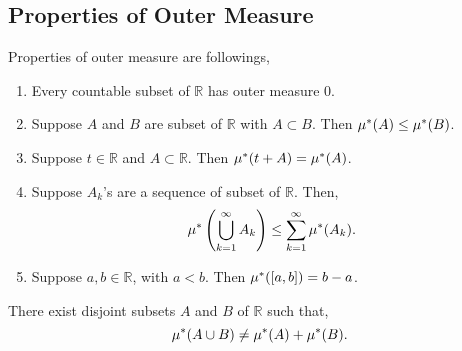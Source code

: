 \subsection*{Properties of Outer Measure}
Properties of outer measure are followings,
\begin{enumerate}
    \item Every countable subset of $\mathds{R}$ has outer measure $0$.
    \item Suppose  $A$ and  $B$ are subset of  $\mathds{R}$ with $A\subset B$. Then  $\mu^{*}(A)\le \mu^{*}(B)$.
    \item Suppose $t\in\mathds{R}$ and $A\subset \mathds{R}$. Then $\mu^{*}(t+A)=\mu^{*}(A)$.
    \item Suppose  $A_k$'s are a sequence of subset of  $\mathds{R}$. Then,
        \[
            \mu^{*}\left( \bigcup_{k=1}^{\infty}A_k \right)\le \sum_{k=1}^{\infty}\mu^{*}(A_k). 
        \]
    \item Suppose $a,b\in\mathds{R}$, with $a<b$. Then  $\mu^{*}([a,b])=b-a$.
\end{enumerate}
\begin{theorem}
    \label{nonadditivity OM}
    There exist disjoint subsets $A$ and  $B$ of  $\mathds{R}$ such that,
    \[
        \mu^{*}(A\cup B)\neq \mu^{*}(A)+\mu^{*}(B).
    \]
\end{theorem}
